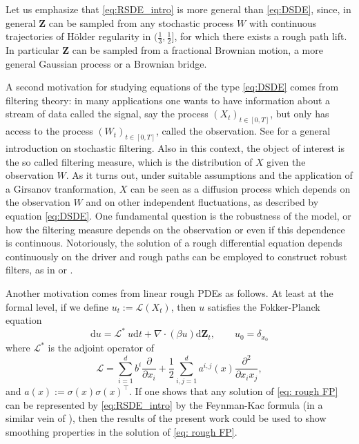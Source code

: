 \documentclass[11pt,a4paper]{article}
\newcommand{\rd}{\mathrm{d}}
\theoremstyle{plain}
\begin{document}
Let us emphasize that \eqref{eq:RSDE_intro} is more general than \eqref{eq:DSDE}, since, in general $\mathbf{Z}$ can be sampled from any stochastic process $W$ with continuous trajectories of Hölder regularity in $(\frac{1}{3},\frac{1}{2}]$, for which there exists a rough path lift. In particular $\mathbf{Z}$ can be sampled from a fractional Brownian motion, a more general Gaussian process or a Brownian bridge.



A second motivation for studying equations of the type \eqref{eq:DSDE} comes from filtering theory: in many applications one wants to have information about a stream of data called the signal, say the process $(X_t)_{t\in[0,T]}$, but only has access to the process $(W_t)_{t\in[0,T]}$, called the observation. See \cite{BC09} for a general introduction on stochastic filtering. Also in this context, the object of interest is the so called filtering measure, which is the distribution of $X$ given the observation $W$. As it turns out, under suitable assumptions and the application of a Girsanov tranformation, $X$ can be seen as a diffusion process which depends on the observation $W$ and on other independent fluctuations, as described by equation \eqref{eq:DSDE}. One fundamental question is the robustness of the model, or how the filtering measure depends on the observation or even if this dependence is continuous. Notoriously, the solution of a rough differential equation depends continuously on the driver and rough paths can be employed to construct robust filters, as in \cite{CDFO13} or \cite{CNNR23}.



Another motivation comes from linear rough PDEs as follows.
At least at the formal level, if we define $u_t := \mathcal{L}(X_t)$, then $u$ satisfies the Fokker-Planck equation
\begin{equation}
\label{eq: rough FP}
    \rd u = \mathcal{L}^\ast \ u \rd t + \nabla \cdot (\beta u) \rd \mathbf{Z}_t, \qquad u_0 = \delta_{x_0}
\end{equation}
where $\mathcal{L}^\ast$ is the adjoint operator of
\begin{equation*}
    \mathcal{L} = \sum_{i=1}^d b^i \frac{\partial}{\partial x_i}
    + \frac{1}{2} \sum_{i,j=1}^d a^{i,j}(x)\frac{\partial^2}{\partial x_i x_j},
\end{equation*}
and $a(x) := \sigma(x)\sigma(x)^\top$. 
If one shows that any solution of \eqref{eq: rough FP} can be represented by \eqref{eq:RSDE_intro} by the Feynman-Kac formula  (in a similar vein of \cite{DFS17}), then the results of the present work could be used to show smoothing properties in the solution of \eqref{eq: rough FP}. 
\end{document}
